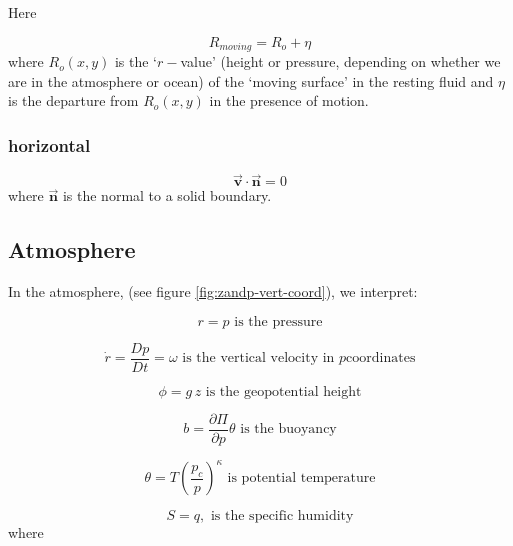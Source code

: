 Here

\begin{equation*}
R_{moving}=R_{o}+\eta
\end{equation*}
where $R_{o}(x,y)$ is the `$r-$value' (height or pressure, depending on
whether we are in the atmosphere or ocean) of the `moving surface' in the
resting fluid and $\eta $ is the departure from $R_{o}(x,y)$ in the presence
of motion.

\subsubsection{horizontal}

\begin{equation}
\vec{\mathbf{v}}\cdot \vec{\mathbf{n}}=0  \label{eq:noflow}
\end{equation}
where $\vec{\mathbf{n}}$ is the normal to a solid boundary.

\subsection{Atmosphere}

In the atmosphere, (see figure \ref{fig:zandp-vert-coord}), we interpret:

\begin{equation}
r=p\text{ is the pressure}  \label{eq:atmos-r}
\end{equation}

\begin{equation}
\dot{r}=\frac{Dp}{Dt}=\omega \text{ is the vertical velocity in }p\text{
coordinates}  \label{eq:atmos-omega}
\end{equation}

\begin{equation}
\phi =g\,z\text{ is the geopotential height}  \label{eq:atmos-phi}
\end{equation}

\begin{equation}
b=\frac{\partial \Pi }{\partial p}\theta \text{ is the buoyancy}
\label{eq:atmos-b}
\end{equation}

\begin{equation}
\theta =T(\frac{p_{c}}{p})^{\kappa }\text{ is potential temperature}
\label{eq:atmos-theta}
\end{equation}

\begin{equation}
S=q,\text{ is the specific humidity}  \label{eq:atmos-s}
\end{equation}
where

